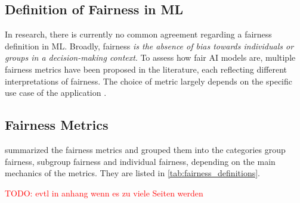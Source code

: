 \documentclass[12pt, a4paper, oneside]{book}   	%
\renewcommand{\todo}[1]{\textcolor{red}{TODO: #1}}
\begin{document}
		
		\subsection{Definition of Fairness in \gls{ML}}
		
		In research, there is currently no common agreement regarding a fairness definition in \gls{ML}. Broadly, fairness \textit{is the absence of bias towards individuals or groups in a decision-making context}. To assess how fair \gls{AI} models are, multiple fairness metrics have been proposed in the literature, each reflecting different interpretations of fairness. The choice of metric largely depends on the specific use case of the application \autocite{Mehrabi_2021}.
		
		\subsection{Fairness Metrics}
		
			\textcite{Mehrabi_2021} summarized the fairness metrics and grouped them into the categories group fairness, subgroup fairness and individual fairness, depending on the main mechanics of the metrics. They are listed in \autoref{tab:fairness_definitions}.
			
			\todo{evtl in anhang wenn es zu viele Seiten werden}
		
\end{document}

